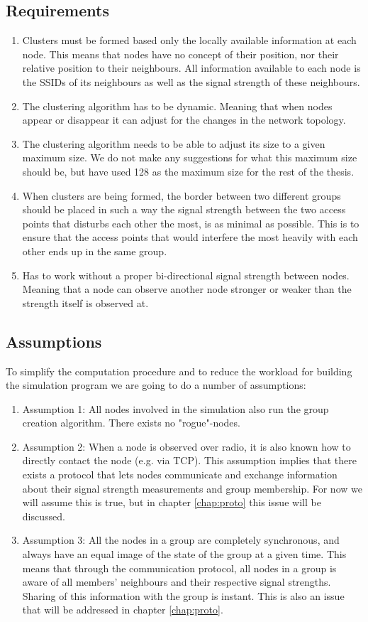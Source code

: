 \subsection{Requirements}\label{chap:requirements}
\begin{enumerate}
	\item Clusters must be formed based only the locally available information at each node. This means that nodes have no concept of their position, 
		nor their relative position to their neighbours. All information available to each node is the SSIDs of its neighbours as well as the signal strength of these neighbours. 
	\item The clustering algorithm has to be dynamic. Meaning that when nodes appear or disappear it can adjust for the changes in the network topology.
	\item The clustering algorithm needs to be able to adjust its size to a given maximum size. We do not make any suggestions for what this maximum size should be, but
		have used 128 as the maximum size for the rest of the thesis. 
		\item When clusters are being formed, the border between two different groups should be placed in such a way the signal strength between the two access points that disturbs each other the most, is as minimal as possible. This is to ensure that the access points that would interfere the most heavily with each other ends up in the same group.
		\item Has to work without a proper bi-directional signal strength between nodes. Meaning that a node can observe another node stronger or weaker than the strength itself is observed at. 
\end{enumerate}

\subsection{Assumptions}\label{chap:assumptions}	
		To simplify the computation procedure and to reduce the workload for building the simulation program we are going to do a number of assumptions:
    \begin{enumerate}
    \item Assumption 1: All nodes involved in the simulation also run the group creation algorithm. There exists no "rogue"-nodes.  
		\item Assumption 2: When a node is observed over radio, it is also known how to directly contact the node (e.g. via TCP). This assumption implies that there exists a protocol that lets nodes communicate and exchange information about their signal strength measurements and group membership. For now we will assume this is true, but in chapter \ref{chap:proto} this issue will be discussed. 
		\item Assumption 3: All the nodes in a group are completely synchronous, and always have an equal image of the state of the group at a given time. This means that through the communication protocol, all nodes in a group is aware of all members' neighbours and their respective signal strengths. Sharing of this information with the group is instant. This is also an issue that will be addressed in chapter \ref{chap:proto}. 
    \end{enumerate}
